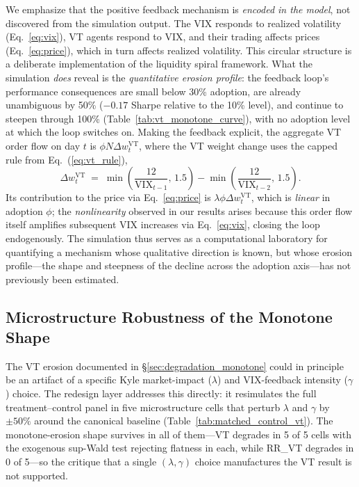 \documentclass[12pt,a4paper]{article}
\begin{document}
We emphasize that the positive feedback mechanism is \emph{encoded in the model}, not discovered from the simulation output. The VIX responds to realized volatility (Eq.~\ref{eq:vix}), VT agents respond to VIX, and their trading affects prices (Eq.~\ref{eq:price}), which in turn affects realized volatility. This circular structure is a deliberate implementation of the \citet{brunnermeier2009} liquidity spiral framework. What the simulation \emph{does} reveal is the \emph{quantitative erosion profile}: the feedback loop's performance consequences are small below 30\% adoption, are already unambiguous by 50\% ($-0.17$ Sharpe relative to the 10\% level), and continue to steepen through 100\% (Table~\ref{tab:vt_monotone_curve}), with no adoption level at which the loop switches on. Making the feedback explicit, the aggregate VT order flow on day $t$ is $\phi N \Delta w_t^{\text{VT}}$, where the VT weight change uses the capped rule from Eq.~(\ref{eq:vt_rule}),
\begin{equation}
  \Delta w_t^{\text{VT}} \;=\; \min\!\left(\frac{12}{\text{VIX}_{t-1}},\,1.5\right) - \min\!\left(\frac{12}{\text{VIX}_{t-2}},\,1.5\right).
  \label{eq:vt_delta}
\end{equation}
Its contribution to the price via Eq.~\eqref{eq:price} is $\lambda \phi \Delta w_t^{\text{VT}}$, which is \emph{linear} in adoption $\phi$; the \emph{nonlinearity} observed in our results arises because this order flow itself amplifies subsequent VIX increases via Eq.~\eqref{eq:vix}, closing the loop endogenously. The simulation thus serves as a computational laboratory for quantifying a mechanism whose qualitative direction is known, but whose erosion profile---the shape and steepness of the decline across the adoption axis---has not previously been estimated.

\subsection{Microstructure Robustness of the Monotone Shape}
\label{sec:oat}

The VT erosion documented in \S\ref{sec:degradation_monotone} could in principle be an artifact of a specific Kyle market-impact ($\lambda$) and VIX-feedback intensity ($\gamma$) choice. The redesign layer addresses this directly: it resimulates the full treatment--control panel in five microstructure cells that perturb $\lambda$ and $\gamma$ by $\pm 50\%$ around the canonical baseline (Table~\ref{tab:matched_control_vt}). The monotone-erosion shape survives in all of them---VT degrades in 5 of 5 cells with the exogenous sup-Wald test rejecting flatness in each, while RR\_VT degrades in 0 of 5---so the critique that a single $(\lambda, \gamma)$ choice manufactures the VT result is not supported.
\end{document}
